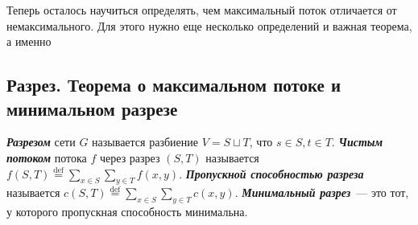 Теперь осталось научиться определять, чем максимальный поток отличается от немаксимального. Для этого нужно еще несколько определений и важная теорема, а именно
\subsection{Разрез. Теорема о максимальном потоке и минимальном разрезе}
\begin{definition}
	{\bf\it Разрезом} сети $G$ называется разбиение $V=S\sqcup T$, что $s\in S,t\in T$.
	{\bf\it Чистым потоком} потока $f$ через разрез $(S,T)$ называется $f(S,T)\overset{\mathrm{def}}{=}\sum_{x\in S}\sum_{y\in T}f(x,y)$.
	{\bf\it Пропускной способностью разреза} называется $c(S,T)\overset{\mathrm{def}}{=}\sum_{x\in S}\sum_{y\in T}c(x,y)$.
	{\bf\it Минимальный разрез}~--- это тот, у которого пропускная способность минимальна.
\end{definition}

